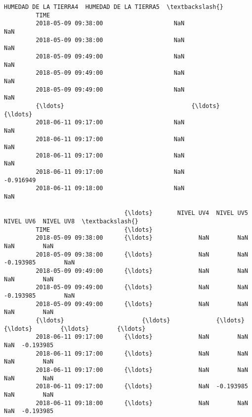 \documentclass[11pt]{article}
\begin{document}
\begin{Verbatim}[commandchars=\\\{\}]
                              HUMEDAD DE LA TIERRA4  HUMEDAD DE LA TIERRA5  \textbackslash{}
         TIME                                                                
         2018-05-09 09:38:00                    NaN                    NaN   
         2018-05-09 09:38:00                    NaN                    NaN   
         2018-05-09 09:49:00                    NaN                    NaN   
         2018-05-09 09:49:00                    NaN                    NaN   
         2018-05-09 09:49:00                    NaN                    NaN   
         {\ldots}                                    {\ldots}                    {\ldots}   
         2018-06-11 09:17:00                    NaN                    NaN   
         2018-06-11 09:17:00                    NaN                    NaN   
         2018-06-11 09:17:00                    NaN                    NaN   
         2018-06-11 09:17:00                    NaN              -0.916949   
         2018-06-11 09:18:00                    NaN                    NaN   
         
                                  {\ldots}       NIVEL UV4  NIVEL UV5  NIVEL UV6  NIVEL UV8  \textbackslash{}
         TIME                     {\ldots}                                                    
         2018-05-09 09:38:00      {\ldots}             NaN        NaN        NaN        NaN   
         2018-05-09 09:38:00      {\ldots}             NaN        NaN  -0.193985        NaN   
         2018-05-09 09:49:00      {\ldots}             NaN        NaN        NaN        NaN   
         2018-05-09 09:49:00      {\ldots}             NaN        NaN  -0.193985        NaN   
         2018-05-09 09:49:00      {\ldots}             NaN        NaN        NaN        NaN   
         {\ldots}                      {\ldots}             {\ldots}        {\ldots}        {\ldots}        {\ldots}   
         2018-06-11 09:17:00      {\ldots}             NaN        NaN        NaN  -0.193985   
         2018-06-11 09:17:00      {\ldots}             NaN        NaN        NaN        NaN   
         2018-06-11 09:17:00      {\ldots}             NaN        NaN        NaN        NaN   
         2018-06-11 09:17:00      {\ldots}             NaN  -0.193985        NaN        NaN   
         2018-06-11 09:18:00      {\ldots}             NaN        NaN        NaN  -0.193985   
         

\end{Verbatim}
\end{document}
